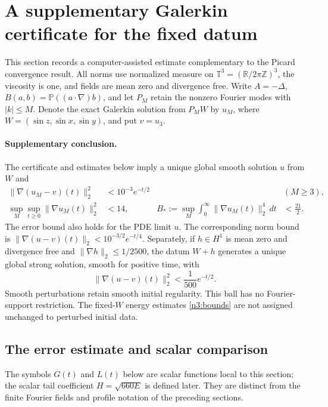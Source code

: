\section{A supplementary Galerkin certificate for the fixed datum}
\label{n3:section}

This section records a computer-assisted estimate complementary to the
Picard convergence result. All norms use normalized measure on
$\mathbb T^3=(\mathbb R/2\pi\mathbb Z)^3$, the viscosity is one, and fields
are mean zero and divergence free. Write $A=-\Delta$,
$B(a,b)=\mathbb P((a\cdot\nabla)b)$, and let $P_M$ retain the nonzero
Fourier modes with $|k|\le M$. Denote the exact Galerkin solution from
$P_MW$ by $u_M$, where $W=(\sin z,\sin x,\sin y)$, and put $v=u_3$.

\paragraph{Supplementary conclusion.}
The certificate and estimates below imply a unique global smooth solution
$u$ from $W$ and
\begin{align}
 \|\nabla(u_M-v)(t)\|_2^2&<10^{-3}e^{-t/2}
       &&(M\ge3),\label{n3:error}\\
 \sup_M\sup_{t\ge0}\|\nabla u_M(t)\|_2^2&<14,
 &B_*:=\sup_M\int_0^\infty\|\nabla u_M(t)\|_2^4\,dt
       &<\frac{21}{2}.\label{n3:bounds}
\end{align}
The error bound also holds for the PDE limit $u$. The corresponding norm
bound is $\|\nabla(u-v)(t)\|_2<10^{-3/2}e^{-t/4}$.
Separately, if $h\in H^1$ is mean zero and divergence free and
$\|\nabla h\|_2\le1/2500$, the datum $W+h$ generates a unique global
strong solution, smooth for positive time, with
\begin{equation}
 \|\nabla(u-v)(t)\|_2^2<\frac1{500}e^{-t/2}.
 \label{n3:ball}
\end{equation}
Smooth perturbations retain smooth initial regularity. This ball has no
Fourier-support restriction. The fixed-$W$ energy estimates
\eqref{n3:bounds} are not assigned unchanged to perturbed initial data.

\subsection{The error estimate and scalar comparison}
\label{n3:error-proof}

The symbols $G(t)$ and $L(t)$ below are scalar functions local to this
section; the scalar tail coefficient $H=\sqrt{660E}$ is defined later.
They are distinct from the finite Fourier fields and profile notation
of the preceding sections.


